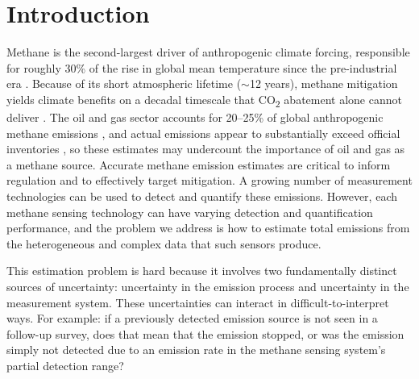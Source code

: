 \documentclass[unnumsec,webpdf,modern,mediumone]{oup-authoring-template}
\begin{document}

\maketitle

\linenumbers

\section{Introduction}
\label{sec:introduction}


Methane is the second-largest driver of anthropogenic climate forcing, responsible for roughly 30\% of the rise in global mean temperature since the pre-industrial era \citep{IPCC2021}. Because of its short atmospheric lifetime ($\sim$12 years), methane mitigation yields climate benefits on a decadal timescale that CO\textsubscript{2} abatement alone cannot deliver \citep{Ocko2021}. The oil and gas sector accounts for 20--25\% of global anthropogenic methane emissions \citep{Saunois2020, Saunois2025}, and actual emissions appear to substantially exceed official inventories \citep{Alvarez2018, Brandt2014}, so these estimates may undercount the importance of oil and gas as a methane source. Accurate methane emission estimates are critical to inform regulation and to effectively target mitigation. A growing number of measurement technologies can be used to detect and quantify these emissions. However, each methane sensing technology can have varying detection and quantification performance, and the problem we address is how to estimate total emissions from the heterogeneous and complex data that such sensors produce.



This estimation problem is hard because it involves two fundamentally distinct sources of uncertainty: uncertainty in the emission process and uncertainty in the measurement system. These uncertainties can interact in difficult-to-interpret ways. For example: if a previously detected emission source is not seen in a follow-up survey, does that mean that the emission stopped, or was the emission simply not detected due to an emission rate in the methane sensing system's partial detection range?
\end{document}
